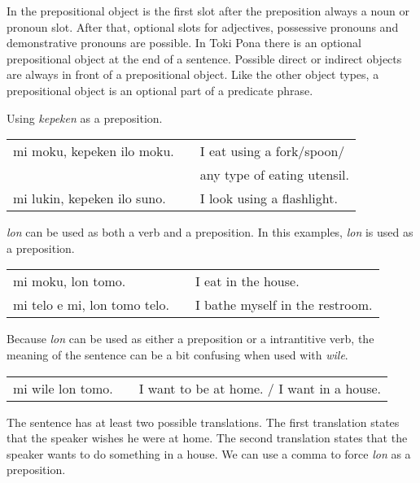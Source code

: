 In the prepositional object is the first slot after the preposition always a noun or pronoun slot.
After that, optional slots for adjectives, possessive pronouns and demonstrative pronouns are possible. 
In Toki Pona there is an optional prepositional object at the end of a sentence. 
Possible direct or indirect objects are always in front of a prepositional object. 
Like the other object types, a prepositional object is an optional part of a predicate phrase. 


Using \textit{kepeken} as a preposition.

\begin{supertabular}{p{5,5cm}|ll}
mi moku, kepeken ilo moku. && I eat using a fork/spoon/ \\ && any type of eating utensil. \\
mi lukin, kepeken ilo suno. && I look using a flashlight.  \\
\end{supertabular} 

%
%
\textit{lon} can be used as both a verb and a preposition. 
In this examples, \textit{lon} is used as a preposition.

\begin{supertabular}{p{5,5cm}|ll}
mi moku, lon tomo. && I eat in the house. \\
mi telo e mi, lon tomo telo. && I bathe myself in the restroom. \\
\end{supertabular} 

Because \textit{lon} can be used as either a preposition or a intrantitive verb, the meaning of the sentence can be a bit confusing when used with \textit{wile}. 

\begin{supertabular}{p{5,5cm}|ll}
mi wile lon tomo. && I want to be at home. / I want in a house. \\
\end{supertabular} 

The sentence has at least two possible translations. 
The first translation states that the speaker wishes he were at home. 
The second translation states that the speaker wants to do something in a house. 
We can use a comma to force \textit{lon} as a preposition.

